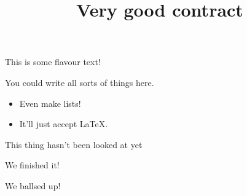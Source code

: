 \documentclass{contract}
\title{Very good contract}
\date{}
\begin{document}
\maketitle

\begin{flavourtext}
  This is some flavour text!\par

  You could write all sorts of things here.

  \begin{itemize}[noitemsep]
    \item Even make lists!
    \item It'll just accept \LaTeX.
  \end{itemize}
\end{flavourtext}


\begin{tasks}
  \item This thing hasn't been looked at yet
  \item[\completed] We finished it!
  \item[\failed] We ballsed up!
  \item {}
\end{tasks}
\end{document}
